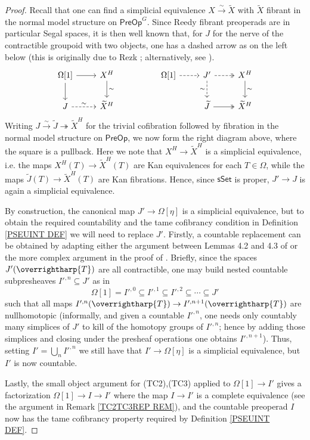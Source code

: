 \documentclass[a4paper,10pt
,draft
]{article}%
\numberwithin{equation}{section}
\numberwithin{figure}{section}
\theoremstyle{definition} %
\newcommand{\vect}[1]{\text{\overrightharp{\ensuremath{#1}}}}
\newcommand{\1}{\ensuremath{\mathbbm 1}}%
\begin{document}
\begin{proof}
	Recall that one can find a simplicial equivalence
	$X \xrightarrow{\sim} \widetilde{X}$
	with $\widetilde{X}$ fibrant in the normal model structure on 
	$\mathsf{PreOp}^G$.
	Since Reedy fibrant preoperads are in particular
	Segal spaces, it is then well known that,
	for $J$ for the nerve of the contractible groupoid
	with two objects,
	one has a dashed arrow as on the left below
	(this is originally due to 
	Rezk \cite[Thm. 6.2]{Rez01}; 
	alternatively, see \cite[Prop. 5.26(iv)]{BP_edss}).
\[
\begin{tikzcd}
	\Omega[1] \ar{r} \ar{d} 
&
	X^H \ar{d}{\sim}
&&
	\Omega[1] \ar[dashed]{r}
&
	J' \ar[dashed,twoheadrightarrow]{r} \ar[dashed]{d}[swap]{\sim} 
&
	X^H \ar{d}{\sim}
\\
	J \ar[dashed]{r}{\sim}
&
	\widetilde{X}^H
&&&
	\widetilde{J} \ar[twoheadrightarrow]{r}
&
	\widetilde{X}^H
\end{tikzcd}
\]	
Writing 
$J \xrightarrow{\sim} 
\widetilde{J} \twoheadrightarrow 
\widetilde{X}^H$
for the trivial cofibration followed by fibration in the normal model structure
on $\mathsf{PreOp}$,
we now form the right diagram above, 
where the square is a pullback.
Here we note that
$X^H \to \widetilde{X}^H$
is a simplicial equivalence,
i.e. the maps
$X^H(T) \to \widetilde{X}^H(T)$
are Kan equivalences for each $T \in \Omega$,
while the maps 
$\widetilde{J}(T) \to \widetilde{X}^H(T)$
are Kan fibrations.
Hence, 
since $\mathsf{sSet}$ is proper, 
$J' \to J$ is again a simplicial equivalence.

By construction, the canonical map 
$J' \to \Omega[\eta]$
is a simplicial equivalence, 
but to obtain the required 
countability and the tame cofibrancy condition in 
Definition \ref{PSEUINT DEF}
we will need to replace $J'$.
Firstly, a countable replacement can be obtained by adapting
either the argument
between Lemmas 4.2 and 4.3 of
\cite{Ber07}
or the more complex argument in the proof of 
\cite[Lemma 5.1.7]{HSS}.
Briefly, since the spaces $J'(\vect{T})$
are all contractible,
one may build nested
countable subpresheaves
$I'^{,n} \subseteq J'$ as in
\[
\Omega[1] = 
I'^{,0} \subseteq
I'^{,1} \subseteq
I'^{,2} \subseteq
\cdots \subseteq
J'
\]
such that all maps 
$I'^{,n}(\vect{T}) \to I'^{,n+1}(\vect{T})$
are nullhomotopic
(informally, and given a countable $I'^{,n}$, 
one needs only countably many simplices of $J'$
to kill of the homotopy groups of $I'^{,n}$; 
hence by adding those simplices and closing under the presheaf operations one obtains $I'^{,n+1}$).
Thus, setting $I' = \bigcup_{n} I'^{,n}$
we still have that $I' \to \Omega[\eta]$
is a simplicial equivalence, 
but $I'$ is now countable.

Lastly, the small object argument for 
(TC2),(TC3) applied to 
$\Omega[1] \to I'$
gives a factorization 
$\Omega[1] \to I \to I'$
where the map $I \to I'$ is a complete equivalence
(see the argument in Remark \ref{TC2TC3REP REM}),
and the countable preoperad $I$
now has the tame cofibrancy property required by 
Definition \ref{PSEUINT DEF}.
\end{proof}
\end{document}
